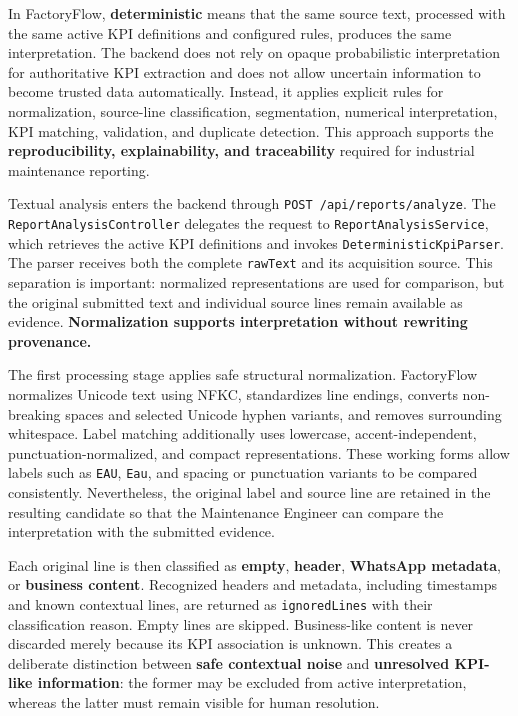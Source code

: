 In FactoryFlow, \textbf{deterministic} means that the same source text, processed with the same active KPI definitions and configured rules, produces the same interpretation. The backend does not rely on opaque probabilistic interpretation for authoritative KPI extraction and does not allow uncertain information to become trusted data automatically. Instead, it applies explicit rules for normalization, source-line classification, segmentation, numerical interpretation, KPI matching, validation, and duplicate detection. This approach supports the \textbf{reproducibility, explainability, and traceability} required for industrial maintenance reporting.

Textual analysis enters the backend through \texttt{POST /api/reports/analyze}. The \texttt{ReportAnalysisController} delegates the request to \texttt{ReportAnalysisService}, which retrieves the active KPI definitions and invokes \texttt{DeterministicKpiParser}. The parser receives both the complete \texttt{rawText} and its acquisition source. This separation is important: normalized representations are used for comparison, but the original submitted text and individual source lines remain available as evidence. \textbf{Normalization supports interpretation without rewriting provenance.}

The first processing stage applies safe structural normalization. FactoryFlow normalizes Unicode text using NFKC, standardizes line endings, converts non-breaking spaces and selected Unicode hyphen variants, and removes surrounding whitespace. Label matching additionally uses lowercase, accent-independent, punctuation-normalized, and compact representations. These working forms allow labels such as \texttt{EAU}, \texttt{Eau}, and spacing or punctuation variants to be compared consistently. Nevertheless, the original label and source line are retained in the resulting candidate so that the Maintenance Engineer can compare the interpretation with the submitted evidence.

Each original line is then classified as \textbf{empty}, \textbf{header}, \textbf{WhatsApp metadata}, or \textbf{business content}. Recognized headers and metadata, including timestamps and known contextual lines, are returned as \texttt{ignoredLines} with their classification reason. Empty lines are skipped. Business-like content is never discarded merely because its KPI association is unknown. This creates a deliberate distinction between \textbf{safe contextual noise} and \textbf{unresolved KPI-like information}: the former may be excluded from active interpretation, whereas the latter must remain visible for human resolution.

